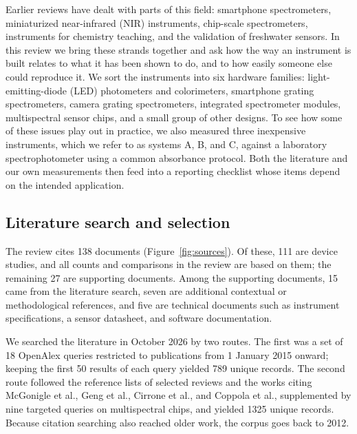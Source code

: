 Earlier reviews have dealt with parts of this field: smartphone spectrometers,\citep{mcgonigle2018smartphone} miniaturized near-infrared (NIR) instruments,\citep{bec2022miniaturized} chip-scale spectrometers,\citep{yang2021miniaturization} instruments for chemistry teaching,\citep{shidiq2020simple} and the validation of freshwater sensors.\citep{cirrone2026analytical} In this review we bring these strands together and ask how the way an instrument is built relates to what it has been shown to do, and to how easily someone else could reproduce it. We sort the instruments into six hardware families: light-emitting-diode (LED) photometers and colorimeters, smartphone grating spectrometers, camera grating spectrometers, integrated spectrometer modules, multispectral sensor chips, and a small group of other designs. To see how some of these issues play out in practice, we also measured three inexpensive instruments, which we refer to as systems A, B, and C, against a laboratory spectrophotometer using a common absorbance protocol. Both the literature and our own measurements then feed into a reporting checklist whose items depend on the intended application.

\subsection{Literature search and selection}\label{sec:method}

The review cites 138 documents (Figure~\ref{fig:sources}). Of these, 111 are device studies, and all counts and comparisons in the review are based on them; the remaining 27 are supporting documents. Among the supporting documents, 15 came from the literature search, seven are additional contextual or methodological references, and five are technical documents such as instrument specifications, a sensor datasheet, and software documentation.

We searched the literature in October 2026 by two routes. The first was a set of 18 OpenAlex queries restricted to publications from 1 January 2015 onward; keeping the first 50 results of each query yielded 789 unique records. The second route followed the reference lists of selected reviews and the works citing McGonigle et al., Geng et al., Cirrone et al., and Coppola et al.,\citep{mcgonigle2018smartphone,geng2017recent,cirrone2026analytical,coppola2024i} supplemented by nine targeted queries on multispectral chips, and yielded 1325 unique records. Because citation searching also reached older work, the corpus goes back to 2012.

